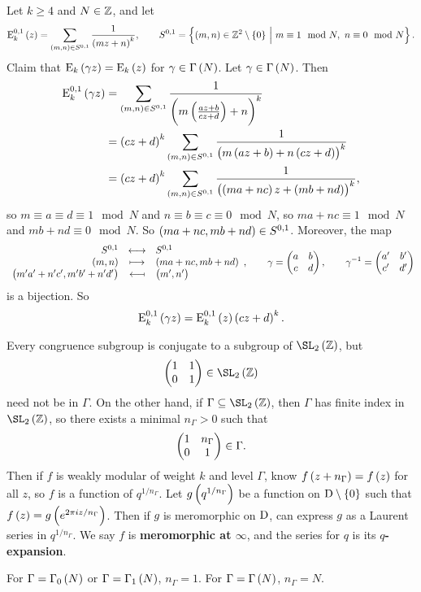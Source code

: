 \begin{example*}
Let $ k \ge 4 $ and $ N \in \mathbb{Z} $, and let
$$ \E_k^{0, 1}\br{z} = \sum_{\br{m, n} \in S^{0, 1}} \dfrac{1}{\br{mz + n}^k}, \qquad S^{0, 1} = \cbr{\br{m, n} \in \ZZ^2 \setminus \cbr{0} \st m \equiv 1 \mod N, \ n \equiv 0 \mod N}. $$
Claim that $ \E_k\br{\gamma z} = \E_k\br{z} $ for $ \gamma \in \Gamma\br{N} $. Let $ \gamma \in \Gamma\br{N} $. Then
\begin{align*}
\E_k^{0, 1}\br{\gamma z}
& = \sum_{\br{m, n} \in S^{0, 1}} \dfrac{1}{\br{m\br{\tfrac{az + b}{cz + d}} + n}^k} \\
& = \br{cz + d}^k\sum_{\br{m, n} \in S^{0, 1}} \dfrac{1}{\br{m\br{az + b} + n\br{cz + d}}^k} \\
& = \br{cz + d}^k\sum_{\br{m, n} \in S^{0, 1}} \dfrac{1}{\br{\br{ma + nc}z + \br{mb + nd}}^k},
\end{align*}
so $ m \equiv a \equiv d \equiv 1 \mod N $ and $ n \equiv b \equiv c \equiv 0 \mod N $, so $ ma + nc \equiv 1 \mod N $ and $ mb + nd \equiv 0 \mod N $. So $ \br{ma + nc, mb + nd} \in S^{0, 1} $. Moreover, the map
$$ \bijection{S^{0, 1}}{S^{0, 1}}{\br{m, n}}{\br{ma + nc, mb + nd}}{\br{m'a' + n'c', m'b' + n'd'}}{\br{m', n'}}, \qquad \gamma = \twobytwo{a}{b}{c}{d}, \qquad \gamma^{-1} = \twobytwo{a'}{b'}{c'}{d'} $$
is a bijection. So
$$ \E_k^{0, 1}\br{\gamma z} = \E_k^{0, 1}\br{z}\br{cz + d}^k. $$
\end{example*}


Every congruence subgroup is conjugate to a subgroup of $ \SL_2\br{\ZZ} $, but
$$ \twobytwo{1}{1}{0}{1} \in \SL_2\br{\ZZ} $$
need not be in $ \Gamma $. On the other hand, if $ \Gamma \subseteq \SL_2\br{\ZZ} $, then $ \Gamma $ has finite index in $ \SL_2\br{\ZZ} $, so there exists a minimal $ n_\Gamma > 0 $ such that
$$ \begin{pmatrix} 1 & n_\Gamma \\ 0 & 1 \end{pmatrix} \in \Gamma. $$
Then if $ f $ is weakly modular of weight $ k $ and level $ \Gamma $, know $ f\br{z + n_\Gamma} = f\br{z} $ for all $ z $, so $ f $ is a function of $ q^{1 / n_\Gamma} $. Let $ g\br{q^{1 / n_\Gamma}} $ be a function on $ \D \setminus \cbr{0} $ such that $ f\br{z} = g\br{e^{2\pi iz / n_\Gamma}} $. Then if $ g $ is meromorphic on $ \mathrm{D} $, can express $ g $ as a Laurent series in $ q^{1 / n_\Gamma} $. We say $ f $ is \textbf{meromorphic at $ \infty $}, and the series for $ q $ is its \textbf{$ q $-expansion}.

\begin{example*}
For $ \Gamma = \Gamma_0\br{N} $ or $ \Gamma = \Gamma_1\br{N} $, $ n_\Gamma = 1 $. For $ \Gamma = \Gamma\br{N} $, $ n_\Gamma = N $.
\end{example*}

